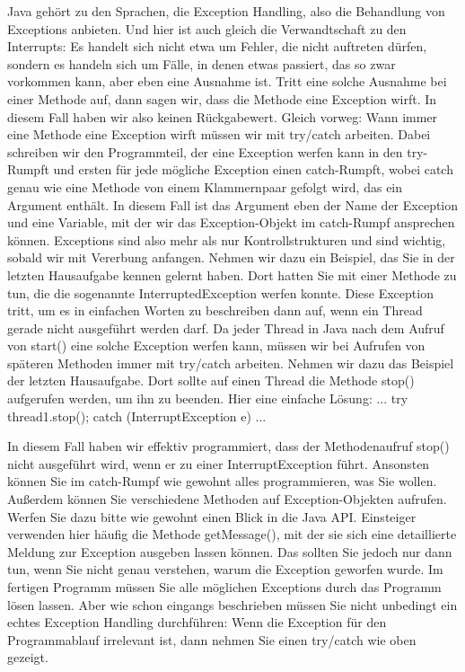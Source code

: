 Java gehört zu den Sprachen, die Exception Handling, also die Behandlung von Exceptions anbieten. Und hier ist auch gleich die Verwandtschaft zu den Interrupts: Es handelt sich nicht etwa um Fehler, die nicht auftreten dürfen, sondern es handeln sich um Fälle, in denen etwas passiert, das so zwar vorkommen kann, aber eben eine Ausnahme ist. Tritt eine solche Ausnahme bei einer Methode auf, dann sagen wir, dass die Methode eine Exception wirft. In diesem Fall haben wir also keinen Rückgabewert.
Gleich vorweg: Wann immer eine Methode eine Exception wirft müssen wir mit try/catch arbeiten. Dabei schreiben wir den Programmteil, der eine Exception werfen kann in den try-Rumpft und ersten für jede mögliche Exception einen catch-Rumpft, wobei catch genau wie eine Methode von einem Klammernpaar gefolgt wird, das ein Argument enthält. In diesem Fall ist das Argument eben der Name der Exception und eine Variable, mit der wir das Exception-Objekt im catch-Rumpf ansprechen können.
Exceptions sind also mehr als nur Kontrollstrukturen und sind wichtig, sobald wir mit Vererbung anfangen. Nehmen wir dazu ein Beispiel, das Sie in der letzten Hausaufgabe kennen gelernt haben. Dort hatten Sie mit einer Methode zu tun, die die sogenannte InterruptedException werfen konnte. Diese Exception tritt, um es in einfachen Worten zu beschreiben dann auf, wenn ein Thread gerade nicht ausgeführt werden darf.
Da jeder Thread in Java nach dem Aufruf von start() eine solche Exception werfen kann, müssen wir bei Aufrufen von späteren Methoden immer mit try/catch arbeiten. Nehmen wir dazu das Beispiel der letzten Hausaufgabe. Dort sollte auf einen Thread die Methode stop() aufgerufen werden, um ihn zu beenden.
Hier eine einfache Lösung:
...
try{
	thread1.stop();
}
catch (InterruptException e){}
...

In diesem Fall haben wir effektiv programmiert, dass der Methodenaufruf stop() nicht ausgeführt wird, wenn er zu einer InterruptException führt. Ansonsten können Sie im catch-Rumpf wie gewohnt alles programmieren, was Sie wollen. Außerdem können Sie verschiedene Methoden auf Exception-Objekten aufrufen. Werfen Sie dazu bitte wie gewohnt einen Blick in die Java API.
Einsteiger verwenden hier häufig die Methode getMessage(), mit der sie sich eine detaillierte Meldung zur Exception ausgeben lassen können. Das sollten Sie jedoch nur dann tun, wenn Sie nicht genau verstehen, warum die Exception geworfen wurde. Im fertigen Programm müssen Sie alle möglichen Exceptions durch das Programm lösen lassen.
Aber wie schon eingangs beschrieben müssen Sie nicht unbedingt ein echtes Exception Handling durchführen: Wenn die Exception für den Programmablauf irrelevant ist, dann nehmen Sie einen try/catch wie oben gezeigt.

